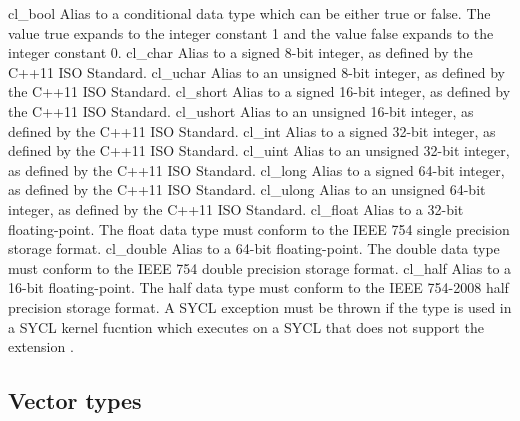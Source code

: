 \addRow
{
  cl_bool
}
{
  Alias to a conditional data type which can be either true or false. The value
  true expands to the integer constant 1 and the value false expands to the
  integer constant 0.
}
\addRow
{
  cl_char
}
{
  Alias to a signed 8-bit integer, as defined by the C++11 ISO Standard.
}
\addRow
{
  cl_uchar
}
{
  Alias to an unsigned 8-bit integer, as defined by the C++11 ISO Standard.
}
\addRow
{
 cl_short
}
{
  Alias to a signed 16-bit integer, as defined by the C++11 ISO Standard.
}
\addRow
{
  cl_ushort
}
{
  Alias to an unsigned 16-bit integer, as defined by the C++11 ISO Standard.
}
\addRow
{
 cl_int
}
{
  Alias to a signed 32-bit integer, as defined by the C++11 ISO Standard.
}
\addRow
{
 cl_uint
}
{
  Alias to an unsigned 32-bit integer, as defined by the C++11 ISO Standard.
}
\addRow
{
 cl_long
}
{
  Alias to a signed 64-bit integer, as defined by the C++11 ISO Standard.
}
\addRow
{
 cl_ulong
}
{
  Alias to an unsigned 64-bit integer, as defined by the C++11 ISO Standard.
}
\addRow
{
  cl_float
}
{
  Alias to a 32-bit floating-point. The float data type must conform to the IEEE
  754 single precision storage format.
}
\addRow
{
 cl_double
}
{
  Alias to a 64-bit floating-point. The double data type must conform to the IEEE
  754 double precision storage format.
}
\addRow
{
  cl_half
}
{
  Alias to a 16-bit floating-point. The half data type must conform to the IEEE
  754-2008 half precision storage format. A SYCL 
  exception must be thrown if the  type is used in a SYCL kernel
  fucntion which executes on a SYCL  that does not support the
  extension .
}
\completeTable

\subsection{Vector types}
\label{sec:vector.type}


